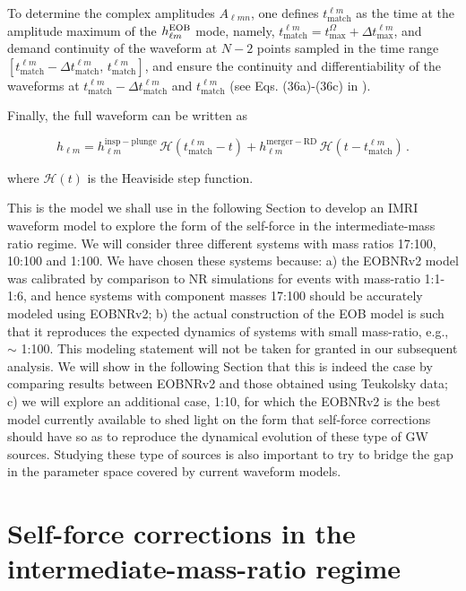  To determine the complex amplitudes \(A_{\ell mn}\), one defines $t_\mathrm{match}^{\ell m}$ as the time at the amplitude maximum of the $h^{\rm EOB}_{\ell m}$ mode, namely, $t_\mathrm{match}^{\ell m}=t_\mathrm{max}^{\Omega}+\Delta t_\mathrm{max}^{\ell m}$, and demand continuity of the waveform at \(N-2\) points sampled in the time range \([ t_\mathrm{match}^{\ell m} - \Delta t_\mathrm{match}^{\ell m},\, t_\mathrm{match}^{\ell m}]\), and ensure the continuity and differentiability of the waveforms at \(t_\mathrm{match}^{\ell m} - \Delta t_\mathrm{match}^{\ell m}\) and \(t_\mathrm{match}^{\ell m}\)  (see Eqs. (36a)-(36c) in \cite{BuonannoEOBv2Main}).
 
Finally,  the full waveform can be written as

 \begin{equation}
  \label{eobfullwave}
  h_{\ell m} = h_{\ell m}^\mathrm{insp-plunge}\, {\mathcal H}(t_\mathrm{match}^{\ell m} - t) + h_{\ell m}^\mathrm{merger-RD}\,{\mathcal H} (t-t_\mathrm{match}^{\ell m})\,.
\end{equation}
 
 \noindent where \( {\mathcal H}(t)\) is the Heaviside step function. 
 
 This is the model we shall use in the following Section to develop an IMRI waveform model to explore the form of the self-force in the intermediate-mass ratio regime. We will consider three different systems with mass ratios 17:100, 10:100 and 1:100. We have chosen these systems because: a) the EOBNRv2 model was calibrated by comparison to NR simulations for events with mass-ratio 1:1-1:6, and hence systems with component masses 17:100 should be accurately modeled using EOBNRv2; b) the actual construction of the EOB model is such that it reproduces the expected dynamics of systems with small mass-ratio, e.g., \(\sim\) 1:100. This modeling statement will not be taken for granted in our subsequent analysis. We will show in the following Section that this is indeed the case by comparing results between EOBNRv2 and those obtained using Teukolsky data; c) we will explore an additional case, 1:10, for which the EOBNRv2 is the best model currently available to shed light on the form that self-force corrections 
should have so as to reproduce the dynamical evolution of these type of GW sources. Studying these type of sources is also important to try to bridge the gap in the parameter space covered by current waveform models.  
 
  
 \section{Self-force corrections in the intermediate-mass-ratio regime}
 \label{s2}
 
